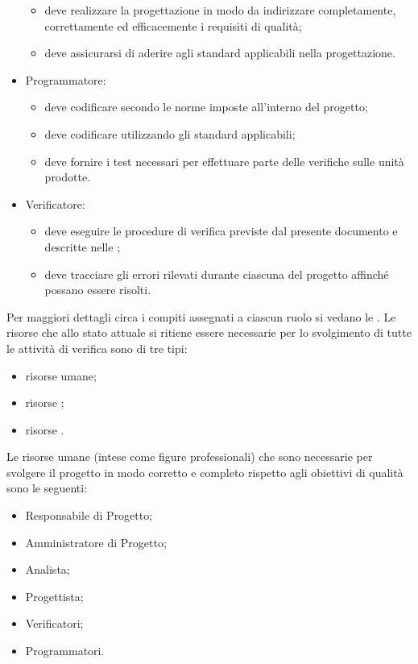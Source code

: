 \begin{itemize}
\begin{itemize}
					\item deve realizzare la progettazione in modo da indirizzare completamente, correttamente ed efficacemente i requisiti di qualità;
					\item deve assicurarsi di aderire agli standard applicabili nella progettazione.
				\end{itemize}
				\item Programmatore:
				\begin{itemize}
					\item deve codificare secondo le norme imposte all'interno del progetto;
					\item deve codificare utilizzando gli standard applicabili;
					\item deve fornire i test necessari per effettuare parte delle verifiche sulle unità  prodotte.
				\end{itemize}
				\item Verificatore:
				\begin{itemize}
					\item deve eseguire le procedure di verifica previste dal presente documento e descritte nelle ;
					\item deve tracciare gli errori rilevati durante ciascuna  del progetto affinché possano essere risolti.
				\end{itemize}
			\end{itemize}
			Per maggiori dettagli circa i compiti assegnati a ciascun ruolo si vedano le .
				Le risorse che allo stato attuale si ritiene essere necessarie per lo svolgimento di tutte le attività di verifica 
				sono di tre tipi:
				\begin{itemize}
					\item risorse umane;
					\item risorse ;
					\item risorse .
				\end{itemize}
					Le risorse umane (intese come figure professionali) che sono necessarie per svolgere il progetto in modo corretto e completo 
					rispetto agli obiettivi di qualità sono le seguenti:
					\begin{itemize}
						\item Responsabile di Progetto;
						\item Amministratore di Progetto;
						\item Analista;
						\item Progettista;
						\item Verificatori;
						\item Programmatori.
					\end{itemize}
